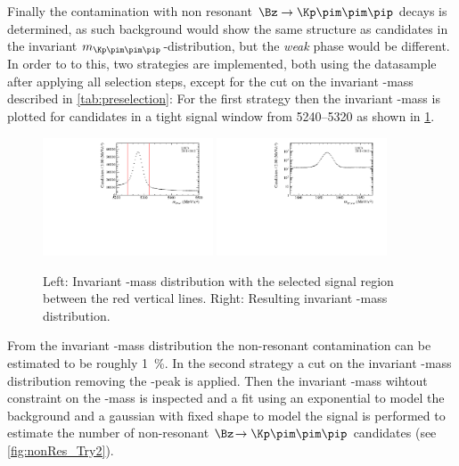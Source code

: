 Finally the contamination with non resonant $\Bz\to\Kp\pim\pim\pip$ decays is determined, as such background would show the same structure as \BdToDpi candidates in the invariant $m_{\Kp\pim\pim\pip}$-distribution, but the \emph{weak} phase would be different.
In order to to this, two strategies are implemented, both using the datasample after applying all selection steps, except for the cut on the invariant \Dm-mass described in \cref{tab:preselection}:
For the first strategy then the invariant \Dm-mass is plotted for candidates in a tight \Bz signal window from \SIrange[per-mode=symbol]{5240}{5320}{\MeVcc} as shown in \cref{fig:nonRes_Try1}.
\begin{figure}[tbp]
    \centering
    \includegraphics[width=0.45\textwidth]{06selection/figs/BmassCut.pdf}
    \includegraphics[width=0.45\textwidth]{06selection/figs/Resulting_Dmass.pdf}
    \caption{Left: Invariant \Bz-mass distribution with the selected signal region between the red vertical lines.
    Right: Resulting invariant \Dm-mass distribution.}
    \label{fig:nonRes_Try1}
\end{figure}
From the invariant \Dm-mass distribution the non-resonant contamination can be estimated to be roughly \SI{1}{\percent}.
In the second strategy a cut on the invariant \Dm-mass distribution removing the \Dm-peak is applied.
Then the invariant \Bz-mass wihtout constraint on the \Dm-mass is inspected and a fit using an exponential to model the background and a gaussian with fixed shape to model the signal is performed to estimate the number of non-resonant $\Bz\!\to\Kp\pim\pim\pip$ candidates (see \cref{fig:nonRes_Try2}).
